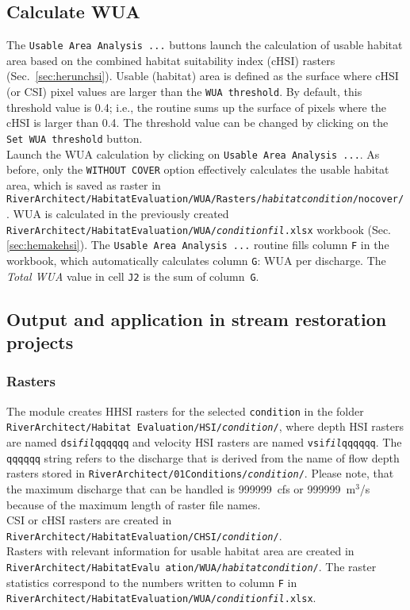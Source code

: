 \subsection{Calculate WUA}\label{sec:herunwua}
The \texttt{Usable Area Analysis ...} buttons launch the calculation of usable habitat area based on the combined habitat suitability index (cHSI) rasters (Sec.~\ref{sec:herunchsi}). Usable (habitat) area is defined as the surface where cHSI (or CSI) pixel values are larger than the \texttt{WUA threshold}. By default, this threshold value is 0.4; i.e., the routine sums up the surface of pixels where the cHSI is larger than 0.4. The threshold value can be changed by clicking on the \texttt{Set WUA threshold} button.\\
Launch the WUA calculation by clicking on \texttt{Usable Area Analysis ...}. As before, only the \texttt{WITHOUT COVER} option effectively calculates the usable habitat area, which is saved as raster in \texttt{RiverArchitect/HabitatEvaluation/WUA/Rasters/\textit{habitat{\myUnderscore}condition}/no{\myUnderscore}cover/}. WUA is calculated in the previously created \texttt{RiverArchitect/HabitatEvaluation/WUA/\textit{condition}{\myUnderscore}\textit{fil}.xlsx} workbook (Sec. \ref{sec:hemakehsi}). The \texttt{Usable Area Analysis ...} routine fills column \texttt{F} in the workbook, which automatically calculates column \texttt{G}: WUA per discharge. The \textit{Total WUA} value in cell \texttt{J2} is the sum of column~\texttt{G}.



\subsection{Output and application in stream restoration projects}
\label{sec:heoutput}
\subsubsection{Rasters}\label{sec:heoutputhhsi}
The module creates HHSI rasters for the selected \texttt{condition} in the folder \texttt{RiverArchitect/Habitat Evaluation/HSI/\textit{condition}/}, where depth HSI rasters are named \texttt{dsi{\myUnderscore}\textit{fil}qqqqqq} and velocity HSI rasters are named \texttt{vsi{\myUnderscore}\textit{fil}qqqqqq}. The \texttt{qqqqqq} string refers to the discharge that is derived from the name of flow depth rasters stored in \texttt{RiverArchitect/01{\myUnderscore}Conditions/\textit{condition}/}. Please note, that the maximum discharge that can be handled is 999999~cfs or 999999~m$^3$/s because of the maximum length of raster file names.\\
CSI or cHSI rasters are created in \texttt{RiverArchitect/HabitatEvaluation/CHSI/\textit{condition}/}.\\
Rasters with relevant information for usable habitat area are created in \texttt{RiverArchitect/HabitatEvalu ation/WUA/\textit{habitat{\myUnderscore}condition}/}. The raster statistics correspond to the numbers written to column \texttt{F} in \texttt{RiverArchitect/HabitatEvaluation/WUA/\textit{condition}{\myUnderscore}\textit{fil}.xlsx}.\\



